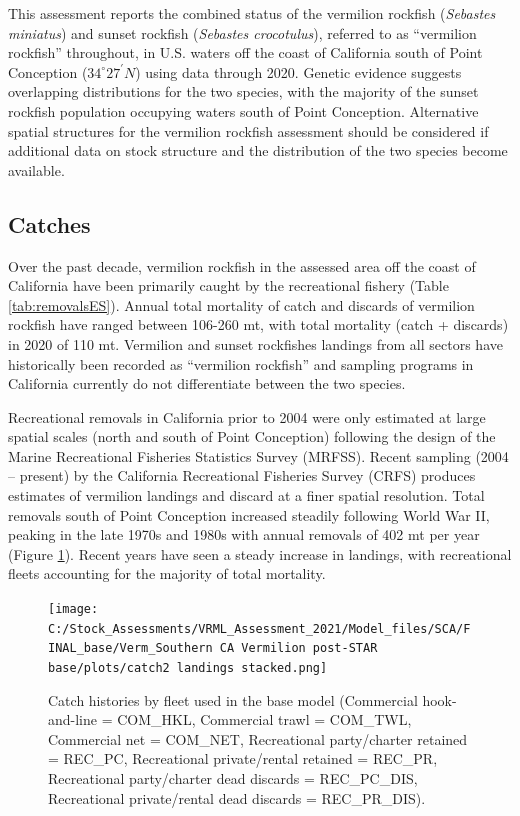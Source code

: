\documentclass[
  english,
  a4paper,
]{article}
\begin{document}
This assessment reports the combined status of the vermilion rockfish (\emph{Sebastes miniatus}) and sunset rockfish (\emph{Sebastes crocotulus}), referred to as ``vermilion rockfish'' throughout, in U.S. waters off the coast of California south
of Point Conception ($34^\circ 27^\prime N$) using data through 2020. Genetic evidence suggests
overlapping distributions for the two species, with the majority of the sunset rockfish population occupying waters south of Point Conception. Alternative spatial structures for the vermilion rockfish assessment should be considered if additional data on stock structure and the distribution of the two species become available.

\hypertarget{catches}{%
\subsection*{Catches}\label{catches}}

Over the past decade, vermilion rockfish in the assessed area off the coast of
California have been
primarily caught by the recreational fishery (Table \ref{tab:removalsES}).
Annual total mortality of catch and discards of vermilion rockfish have ranged between
106-260
mt, with total mortality (catch + discards) in 2020 of 110 mt.
Vermilion and sunset rockfishes landings from all sectors have historically been recorded as
``vermilion rockfish'' and sampling programs in California currently do not
differentiate between the two species.

Recreational removals in California prior to 2004 were only estimated at large
spatial scales (north and south of Point Conception) following the design of
the Marine Recreational Fisheries Statistics Survey (MRFSS). Recent sampling
(2004 -- present) by the California Recreational Fisheries Survey (CRFS) produces
estimates of vermilion landings and discard at a finer spatial resolution. Total
removals south of Point Conception increased steadily following World
War II, peaking in the late 1970s and 1980s with annual removals of
402 mt per year (Figure \ref{fig:catchES}). Recent
years have seen a steady increase in landings, with recreational fleets accounting
for the majority of total mortality.

\FloatBarrier

\begin{figure}
\centering
\texttt{[image: C:/Stock\_Assessments/VRML\_Assessment\_2021/Model\_files/SCA/FINAL\_base/Verm\_Southern CA Vermilion post-STAR base/plots/catch2 landings stacked.png]}
\caption{Catch histories by fleet used in the base model
(Commercial hook-and-line = COM\_HKL,
Commercial trawl = COM\_TWL, Commercial net = COM\_NET,
Recreational party/charter retained = REC\_PC, Recreational
private/rental retained = REC\_PR, Recreational party/charter
dead discards = REC\_PC\_DIS, Recreational private/rental dead
discards = REC\_PR\_DIS).\label{fig:catchES}}
\end{figure}
\end{document}
